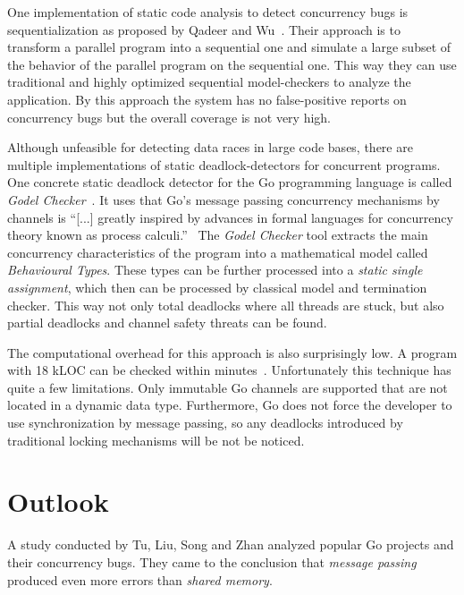\documentclass[conference]{IEEEtran}
\begin{document}
One implementation of static code analysis to detect concurrency bugs is sequentialization as proposed by Qadeer and Wu~\cite{qadeer2004kiss}.
Their approach is to transform a parallel program into a sequential one and simulate a large subset of the behavior of the parallel program on the sequential one.
This way they can use traditional and highly optimized sequential model-checkers to analyze the application.
By this approach the system has no false-positive reports on concurrency bugs but the overall coverage is not very high.

Although unfeasible for detecting data races in large code bases, there are multiple implementations of static deadlock-detectors for concurrent programs.
One concrete static deadlock detector for the Go programming language is called \emph{Godel Checker}~\cite{godelChecker}.
It uses that Go's message passing concurrency mechanisms by channels is ``[...] greatly inspired by advances in formal languages for concurrency theory known as process calculi.''~\cite{lange2018verification}
The \emph{Godel Checker} tool extracts the main concurrency characteristics of the program into a mathematical model called \emph{Behavioural Types}.
These types can be further processed into a \emph{static single assignment}, which then can be processed by classical model and termination checker.
This way not only total deadlocks where all threads are stuck, but also partial deadlocks and channel safety threats can be found.

The computational overhead for this approach is also surprisingly low.
A program with 18 kLOC can be checked within minutes~\cite{lange2018verification}.
Unfortunately this technique has quite a few limitations.
Only immutable Go channels are supported that are not located in a dynamic data type.
Furthermore, Go does not force the developer to use synchronization by message passing, so any deadlocks introduced by traditional locking mechanisms will be not be noticed.

\section{Outlook}
\label{sct:outlook}
A study conducted by Tu, Liu, Song and Zhan analyzed popular Go projects and their concurrency bugs.
They came to the conclusion that \emph{message passing} produced even more errors than \emph{shared memory}.
\end{document}
